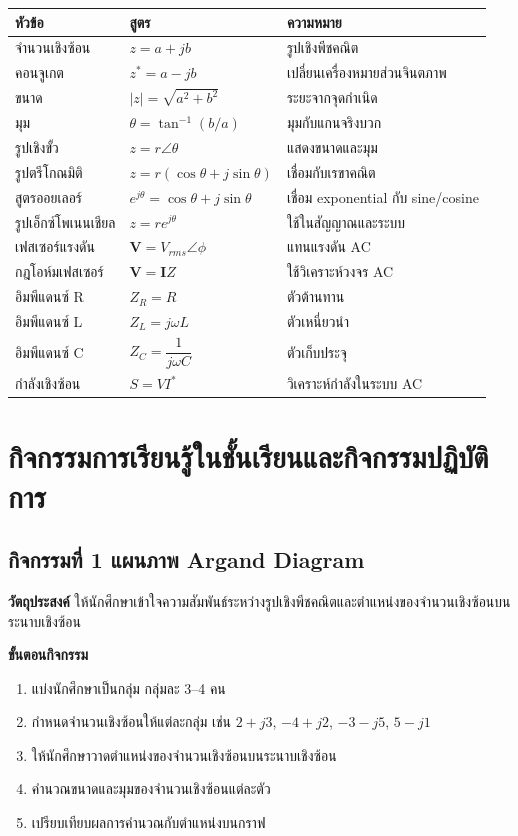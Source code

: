 \begin{longtable}{L{0.26\textwidth}L{0.37\textwidth}L{0.27\textwidth}}
\toprule
\textbf{หัวข้อ} & \textbf{สูตร} & \textbf{ความหมาย} \\
\midrule
จำนวนเชิงซ้อน & $z=a+jb$ & รูปเชิงพีชคณิต \\
คอนจูเกต & $z^*=a-jb$ & เปลี่ยนเครื่องหมายส่วนจินตภาพ \\
ขนาด & $|z|=\sqrt{a^2+b^2}$ & ระยะจากจุดกำเนิด \\
มุม & $\theta=\tan^{-1}(b/a)$ & มุมกับแกนจริงบวก \\
รูปเชิงขั้ว & $z=r\angle\theta$ & แสดงขนาดและมุม \\
รูปตรีโกณมิติ & $z=r(\cos\theta+j\sin\theta)$ & เชื่อมกับเรขาคณิต \\
สูตรออยเลอร์ & $e^{j\theta}=\cos\theta+j\sin\theta$ & เชื่อม exponential กับ sine/cosine \\
รูปเอ็กซ์โพเนนเชียล & $z=re^{j\theta}$ & ใช้ในสัญญาณและระบบ \\
เฟสเซอร์แรงดัน & $\mathbf{V}=V_{rms}\angle\phi$ & แทนแรงดัน AC \\
กฎโอห์มเฟสเซอร์ & $\mathbf{V}=\mathbf{I}Z$ & ใช้วิเคราะห์วงจร AC \\
อิมพีแดนซ์ R & $Z_R=R$ & ตัวต้านทาน \\
อิมพีแดนซ์ L & $Z_L=j\omega L$ & ตัวเหนี่ยวนำ \\
อิมพีแดนซ์ C & $Z_C=\dfrac{1}{j\omega C}$ & ตัวเก็บประจุ \\
กำลังเชิงซ้อน & $S=VI^*$ & วิเคราะห์กำลังในระบบ AC \\
\bottomrule
\end{longtable}

\section{กิจกรรมการเรียนรู้ในชั้นเรียนและกิจกรรมปฏิบัติการ}

\subsection{กิจกรรมที่ 1 แผนภาพ Argand Diagram}

\textbf{วัตถุประสงค์}  
ให้นักศึกษาเข้าใจความสัมพันธ์ระหว่างรูปเชิงพีชคณิตและตำแหน่งของจำนวนเชิงซ้อนบนระนาบเชิงซ้อน

\textbf{ขั้นตอนกิจกรรม}

\begin{enumerate}
\item แบ่งนักศึกษาเป็นกลุ่ม กลุ่มละ 3--4 คน
\item กำหนดจำนวนเชิงซ้อนให้แต่ละกลุ่ม เช่น $2+j3$, $-4+j2$, $-3-j5$, $5-j1$
\item ให้นักศึกษาวาดตำแหน่งของจำนวนเชิงซ้อนบนระนาบเชิงซ้อน
\item คำนวณขนาดและมุมของจำนวนเชิงซ้อนแต่ละตัว
\item เปรียบเทียบผลการคำนวณกับตำแหน่งบนกราฟ
\end{enumerate}

